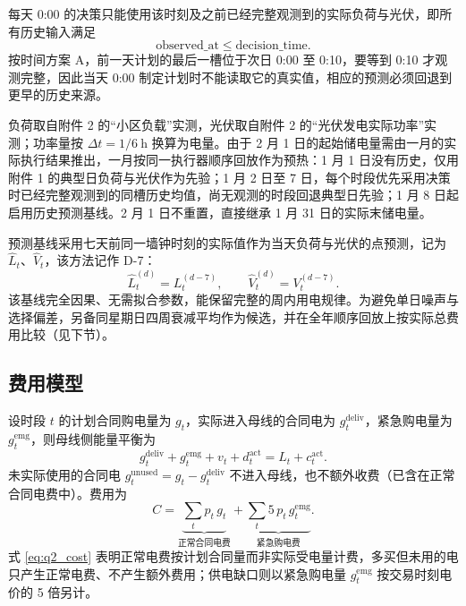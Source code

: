 \documentclass[withoutpreface,bwprint]{cumcmthesis}
\begin{document}
每天 0:00 的决策只能使用该时刻及之前已经完整观测到的实际负荷与光伏，即所有历史输入满足
\begin{equation}
\mathrm{observed\_at}\le \mathrm{decision\_time}.
\label{eq:q2_causal}
\end{equation}
按时间方案 A，前一天计划的最后一槽位于次日 0:00 至 0:10，要等到 0:10 才观测完整，因此当天 0:00 制定计划时不能读取它的真实值，相应的预测必须回退到更早的历史来源。

负荷取自附件 2 的“小区负载”实测，光伏取自附件 2 的“光伏发电实际功率”实测；功率量按 $\Delta t=1/6\ \mathrm{h}$ 换算为电量。由于 2 月 1 日的起始储电量需由一月的实际执行结果推出，一月按同一执行器顺序回放作为预热：1 月 1 日没有历史，仅用附件 1 的典型日负荷与光伏作为先验；1 月 2 日至 7 日，每个时段优先采用决策时已经完整观测到的同槽历史均值，尚无观测的时段回退典型日先验；1 月 8 日起启用历史预测基线。2 月 1 日不重置，直接继承 1 月 31 日的实际末储电量。

预测基线采用七天前同一墙钟时刻的实际值作为当天负荷与光伏的点预测，记为 $\hat L_t$、$\hat V_t$，该方法记作 D-7：
\begin{equation}
\hat L_t^{(d)}=L_t^{(d-7)},\qquad \hat V_t^{(d)}=V_t^{(d-7)}.
\label{eq:q2_forecast}
\end{equation}
该基线完全因果、无需拟合参数，能保留完整的周内用电规律。为避免单日噪声与选择偏差，另备同星期日四周衰减平均作为候选，并在全年顺序回放上按实际总费用比较（见下节）。

\subsection{费用模型}

设时段 $t$ 的计划合同购电量为 $g_t$，实际进入母线的合同电为 $g_t^{\mathrm{deliv}}$，紧急购电量为 $g_t^{\mathrm{emg}}$，则母线侧能量平衡为
\begin{equation}
g_t^{\mathrm{deliv}}+g_t^{\mathrm{emg}}+v_t+d_t^{\mathrm{act}}=L_t+c_t^{\mathrm{act}}.
\label{eq:q2_balance}
\end{equation}
未实际使用的合同电 $g_t^{\mathrm{unused}}=g_t-g_t^{\mathrm{deliv}}$ 不进入母线，也不额外收费（已含在正常合同电费中）。费用为
\begin{equation}
C=\underbrace{\sum_{t} p_t\,g_t}_{\text{正常合同电费}}+\underbrace{\sum_{t} 5\,p_t\,g_t^{\mathrm{emg}}}_{\text{紧急购电费}}.
\label{eq:q2_cost}
\end{equation}
式 \eqref{eq:q2_cost} 表明正常电费按计划合同量而非实际受电量计费，多买但未用的电只产生正常电费、不产生额外费用；供电缺口则以紧急购电量 $g_t^{\mathrm{emg}}$ 按交易时刻电价的 5 倍另计。
\end{document}
